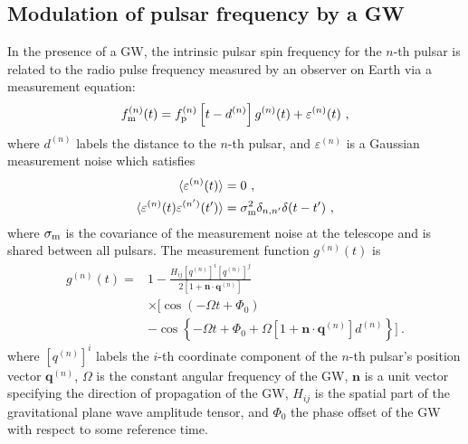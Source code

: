 \documentclass[fleqn,usenatbib,useAMS]{mnras}
\begin{document}
\subsection{Modulation of pulsar frequency by a GW} \label{sec:psr_measured}
In the presence of a GW, the intrinsic pulsar spin frequency for the $n$-th pulsar is related to the radio pulse frequency measured by an observer on Earth via a measurement equation:
\begin{equation}
	f_{\rm m}^{(n)}(t) = f_{\rm p}^{(n)}\left [t-d^{(n)} \right ] g^{(n)}(t) +  \varepsilon^{(n)}(t)\ ,
	\label{eq:measurement}
\end{equation}
where $d^{(n)}$ labels the distance to the $n$-th pulsar, and $\varepsilon^{(n)}$ is a Gaussian measurement noise which satisfies 
\begin{align}
	\langle \varepsilon^{(n)}(t) \rangle &= 0 \ , \\
	\langle \varepsilon^{(n)}(t) \varepsilon^{(n')}(t') \rangle &= \sigma_{\rm m}^2 \delta_{n,n'} \delta(t - t') \ ,	\label{eq:vareps}
\end{align}
where $\sigma_{\rm m}$ is the covariance of the measurement noise at the telescope and is shared between all pulsars. The measurement function $g^{(n)}(t)$ is
\begin{align}
	g^{(n)}(t) =& 1 - \frac{ H_{ij}[q^{(n)}]^i [q^{(n)}]^j }{2 [1 + \boldsymbol{n}\cdot \boldsymbol{q}^{(n)}] } \nonumber \\
	& \times \Big[\cos\left(-\Omega t +\Phi_0\right) \nonumber \\
	&- \cos \left \{-\Omega t +\Phi_0 + \Omega \left[1 + \boldsymbol{n}\cdot \boldsymbol{q}^{(n)} \right]  d^{(n)} \right \} \Big ] \ .
	\label{eq:g_func_trig}
\end{align}
where $[q^{(n)}]^i$ labels the $i$-th coordinate component of the $n$-th pulsar's position vector $\boldsymbol{q}^{(n)}$, $\Omega$ is the constant angular frequency of the GW, $\boldsymbol{n}$ is a unit vector specifying the direction of propagation of the GW, $H_{ij}$ is the spatial part of the gravitational plane wave amplitude tensor, and $\Phi_0$ the phase offset of the GW with respect to some reference time. \newline  
\end{document}
